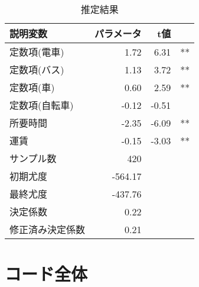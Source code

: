 \begin{table}
    \centering
    \caption{推定結果}
    \label{tab:est_result}
    \begin{tabular}{lrrl}
        \hline
        説明変数     & パラメータ   & t値         \\
        \hline
        定数項(電車)  & 1.72    & 6.31  & ** \\
        定数項(バス)  & 1.13    & 3.72  & ** \\
        定数項(車)   & 0.60    & 2.59  & ** \\
        定数項(自転車) & -0.12   & -0.51 &    \\
        所要時間     & -2.35   & -6.09 & ** \\
        運賃       & -0.15   & -3.03 & ** \\
        \hline
        サンプル数    & 420     &       &    \\
        初期尤度     & -564.17 &       &    \\
        最終尤度     & -437.76 &       &    \\
        決定係数     & 0.22    &       &    \\
        修正済み決定係数 & 0.21    &       &    \\
        \hline
    \end{tabular}
\end{table}

\section{コード全体}


